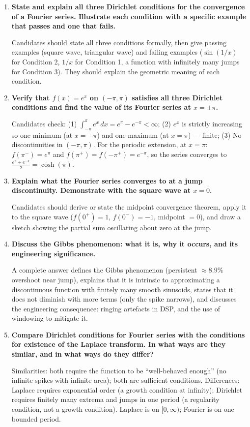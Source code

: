 \documentclass[12pt,a4paper]{article}
\begin{document}
\begin{enumerate}[label=\textbf{\arabic*.}]

\item \textbf{State and explain all three Dirichlet conditions for the convergence of a Fourier series. Illustrate each condition with a specific example that passes and one that fails.}

   Candidates should state all three conditions formally, then give passing examples (square wave, triangular wave) and failing examples ($\sin(1/x)$ for Condition 2, $1/x$ for Condition 1, a function with infinitely many jumps for Condition 3). They should explain the geometric meaning of each condition.

\item \textbf{Verify that $f(x) = e^x$ on $(-\pi,\pi)$ satisfies all three Dirichlet conditions and find the value of its Fourier series at $x = \pm\pi$.}

   Candidates check: (1) $\int_{-\pi}^{\pi}e^x\,dx = e^{\pi}-e^{-\pi} < \infty$; (2) $e^x$ is strictly increasing so one minimum (at $x=-\pi$) and one maximum (at $x=\pi$) --- finite; (3) No discontinuities in $(-\pi,\pi)$. For the periodic extension, at $x=\pi$: $f(\pi^-)=e^{\pi}$ and $f(\pi^+)=f(-\pi^+)=e^{-\pi}$, so the series converges to $\frac{e^{\pi}+e^{-\pi}}{2}=\cosh(\pi)$.

\item \textbf{Explain what the Fourier series converges to at a jump discontinuity. Demonstrate with the square wave at $x=0$.}

   Candidates should derive or state the midpoint convergence theorem, apply it to the square wave ($f(0^+)=1$, $f(0^-)=-1$, midpoint $=0$), and draw a sketch showing the partial sum oscillating about zero at the jump.

\item \textbf{Discuss the Gibbs phenomenon: what it is, why it occurs, and its engineering significance.}

   A complete answer defines the Gibbs phenomenon (persistent $\approx 8.9\%$ overshoot near jump), explains that it is intrinsic to approximating a discontinuous function with finitely many smooth sinusoids, states that it does not diminish with more terms (only the spike narrows), and discusses the engineering consequence: ringing artefacts in DSP, and the use of windowing to mitigate it.

\item \textbf{Compare Dirichlet conditions for Fourier series with the conditions for existence of the Laplace transform. In what ways are they similar, and in what ways do they differ?}

   Similarities: both require the function to be ``well-behaved enough'' (no infinite spikes with infinite area); both are sufficient conditions. Differences: Laplace requires exponential order (a growth condition at infinity); Dirichlet requires finitely many extrema and jumps in one period (a regularity condition, not a growth condition). Laplace is on $[0,\infty)$; Fourier is on one bounded period.

\end{enumerate}
\end{document}
